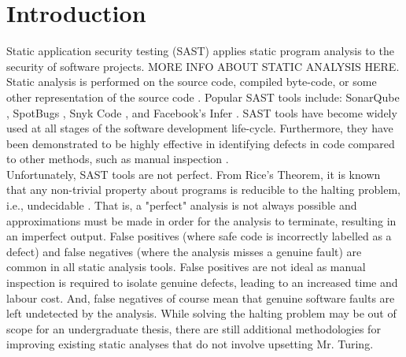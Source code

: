 \chapter[Introduction]{Introduction}
\label{Chap:Intro}


\noindent
Static application security testing (SAST) applies static program analysis to the security of software projects. MORE INFO ABOUT STATIC ANALYSIS HERE. Static analysis is performed on the source code, compiled byte-code, or some other representation of the source code \cite{NielsonFlemming2005Popa}. Popular SAST tools include: SonarQube \cite{sonarqube}, SpotBugs \cite{spotbugs}, Snyk Code \cite{snykcode}, and Facebook's Infer \cite{infer}. SAST tools have become widely used at all stages of the software development life-cycle. Furthermore, they have been demonstrated to be highly effective in identifying defects in code compared to other methods, such as manual inspection \cite{Nichols2020}.\\

\noindent
Unfortunately, SAST tools are not perfect. From Rice's Theorem, it is known that any non-trivial property about programs is reducible to the halting problem, i.e., undecidable \cite{moller2012static}. That is, a "perfect" analysis is not always possible and approximations must be made in order for the analysis to terminate, resulting in an imperfect output. False positives (where safe code is incorrectly labelled as a defect) and false negatives (where the analysis misses a genuine fault) \cite{chess2004static} are common in all static analysis tools. False positives are not ideal as manual inspection is required to isolate genuine defects, leading to an increased time and labour cost. And, false negatives of course mean that genuine software faults are left undetected by the analysis. While solving the halting problem may be out of scope for an undergraduate thesis, there are still additional methodologies for improving existing static analyses that do not involve upsetting Mr. Turing.\\

